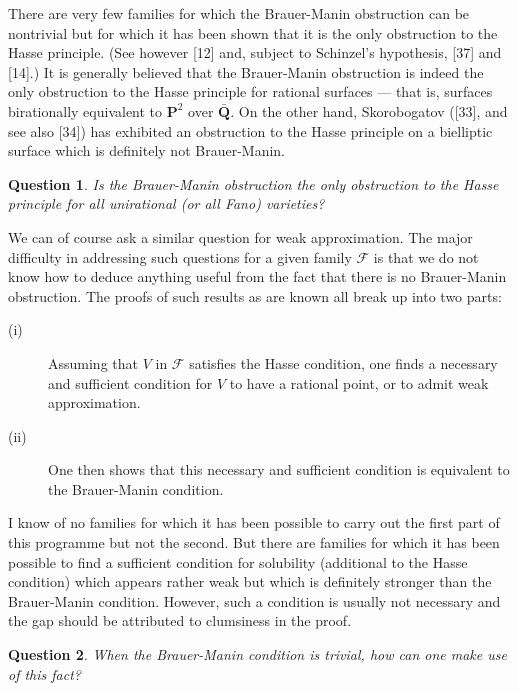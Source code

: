 \documentclass[12pt]{article}
\def\bP{{\mathbf P}}
\def\bQ{{\mathbf Q}}
\def\sF{{\mathcal F}}
\def\bpr{\begin{question} \label}
\def\epr{\end{question}}
\newtheorem{question}{Question}
\begin{document}
There are very few families for which the Brauer-Manin obstruction can be
nontrivial but for which
it has been shown that it is the only obstruction to the Hasse
principle. (See however [12] and, subject to Schinzel's hypothesis, [37]
and [14].) It is generally believed that the Brauer-Manin obstruction is
indeed the
only obstruction to the Hasse principle for rational
surfaces --- that is, surfaces birationally equivalent to $\bP^2$ over
$\bar{\bQ}$. On the other hand, Skorobogatov ([33], and see also [34]) has
exhibited an obstruction to the Hasse principle on a bielliptic surface which
is definitely not Brauer-Manin.
\bpr{Q4} Is the Brauer-Manin obstruction the only obstruction
to the Hasse principle for all unirational (or all Fano) varieties?
\epr
We can of course ask a similar question for weak approximation.
The major difficulty in addressing such questions for a given family $\sF$
is that we do not know how to deduce anything useful from the fact that there
is no Brauer-Manin obstruction. The proofs of such results as are known all
break up into two parts:
\begin{description}
\item[(i)] Assuming that $V$ in $\sF$ satisfies the Hasse condition, one finds
a necessary and sufficient condition for $V$ to have a rational point, or to
admit weak approximation.
\item[(ii)] One then shows that this necessary and sufficient condition is
equivalent to the Brauer-Manin condition.
\end{description}
I know of no families for which it has been possible to carry out the first
part of this programme but not the second. But there are families for which it
has been possible to find a sufficient condition for solubility (additional to
the Hasse condition) which appears rather weak but which is
definitely stronger than the Brauer-Manin condition. However, such a condition
is usually not necessary and
the gap should be attributed to clumsiness in the proof.
\bpr{Q5} When the Brauer-Manin condition is trivial, how can one make use of
this fact?
\epr

\bigskip
\end{document}
